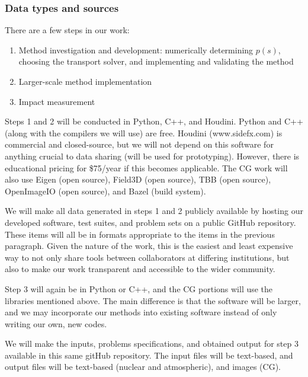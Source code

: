 \documentclass[12pt]{article}
\begin{document}
{
\subsubsection*{Data types and sources}\vspace{-15pt}
There are a few steps in our work:\vspace{-5pt}
\begin{enumerate}
\item Method investigation and development: numerically determining $p(s)$, choosing the transport solver, and implementing and validating the method\vspace{-5pt}
\item Larger-scale method implementation\vspace{-5pt}
\item Impact measurement\vspace{-5pt}
\end{enumerate}

Steps 1 and 2 will be conducted in Python, C++, and Houdini. Python and C++ (along with the compilers we will use) are free. Houdini (www.sidefx.com) is commercial and closed-source, but we will not depend on this software for anything crucial to data sharing (will be used for prototyping). However, there is educational pricing for \$75/year if this becomes applicable. The CG work will also use Eigen (open source), Field3D (open source), TBB (open source), OpenImageIO (open source), and Bazel (build system).

We will make all data generated in steps 1 and 2 publicly available by hosting our developed software, test suites, and problem sets on a public GitHub repository. These items will all be in formats appropriate to the items in the previous paragraph. Given the nature of the work, this is the easiest and least expensive way to not only share tools between collaborators at differing institutions, but also to make our work transparent and accessible to the wider community. 

Step 3 will again be in Python or C++, and the CG portions will use the libraries mentioned above. The main difference is that the software will be larger, and we may incorporate our methods into existing software instead of only writing our own, new codes. 

We will make the inputs, problems specifications, and obtained output for step 3 available in this same gitHub repository. The input files will be text-based, and output files will be text-based (nuclear and atmospheric), and images (CG). 

}
\end{document}
